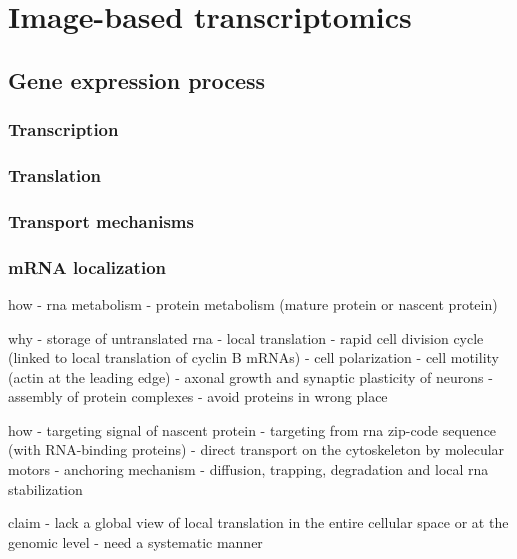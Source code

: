 
\graphicspath{{./figures/introduction/}}

\chapter{Image-based transcriptomics}
\label{ch:introduction}

\minitoc
\newpage

\section{Gene expression process}
\label{sec:gene_expression}

\subsection{Transcription}

\subsection{Translation}

\subsection{Transport mechanisms}

\subsection{\ac{mRNA} localization}


how
- rna metabolism
- protein metabolism (mature protein or nascent protein)

why
- storage of untranslated rna
- local translation
- rapid cell division cycle (linked to local translation of cyclin B mRNAs)
- cell polarization
- cell motility (actin at the leading edge)
- axonal growth and synaptic plasticity of neurons
- assembly of protein complexes
- avoid proteins in wrong place

how
- targeting signal of nascent protein
- targeting from rna zip-code sequence (with RNA-binding proteins)
- direct transport on the cytoskeleton by molecular motors
- anchoring mechanism
- diffusion, trapping, degradation and local rna stabilization

claim
- lack a global view of local translation in the entire cellular space or at the genomic level
- need a systematic manner


